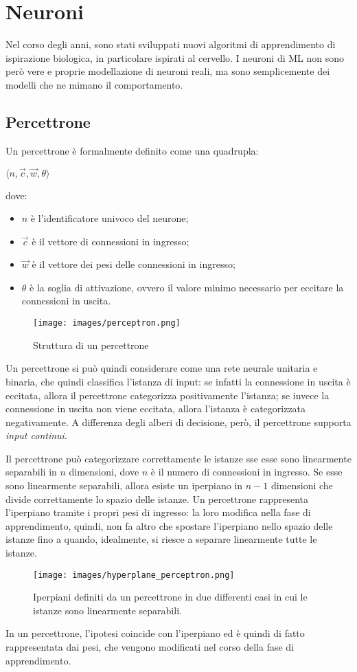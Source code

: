 \section{Neuroni}
Nel corso degli anni, sono stati sviluppati nuovi algoritmi di apprendimento di ispirazione biologica, in particolare ispirati al cervello.
I neuroni di ML non sono però vere e proprie modellazione di neuroni reali, ma sono semplicemente dei modelli che ne mimano il comportamento.

\subsection{Percettrone}
Un percettrone è formalmente definito come una quadrupla:
\begin{center}
    $\langle n, \Vec{c}, \Vec{w}, \theta \rangle$
\end{center}
dove:
\begin{itemize}
    \item $n$ è l'identificatore univoco del neurone;
    \item $\Vec{c}$ è il vettore di connessioni in ingresso;
    \item $\Vec{w}$ è il vettore dei pesi delle connessioni in ingresso;
    \item $\theta$ è la soglia di attivazione, ovvero il valore minimo necessario per eccitare la connessioni in uscita.
\end{itemize}

\begin{figure}[h]
    \centering
    \texttt{[image: images/perceptron.png]}
    \caption{Struttura di un percettrone}
    \label{fig:perceptron}
\end{figure}
Un percettrone si può quindi considerare come una rete neurale unitaria e binaria, che quindi classifica l'istanza di input: se infatti la connessione in uscita è eccitata, allora il percettrone categorizza positivamente l'istanza; se invece la connessione in uscita non viene eccitata, allora l'istanza è categorizzata negativamente.
A differenza degli alberi di decisione, però, il percettrone supporta \textit{input continui}.

Il percettrone può categorizzare correttamente le istanze sse esse sono linearmente separabili in $n$ dimensioni, dove $n$ è il numero di connessioni in ingresso. Se esse sono linearmente separabili, allora esiste un iperpiano in $n-1$ dimensioni che divide correttamente lo spazio delle istanze.
Un percettrone rappresenta l'iperpiano tramite i propri  pesi di ingresso: la loro modifica nella fase di apprendimento, quindi, non fa altro che spostare l'iperpiano nello spazio delle istanze fino a quando, idealmente, si riesce a separare linearmente tutte le istanze.
\begin{figure}[h]
    \centering
    \texttt{[image: images/hyperplane\_perceptron.png]}
    \caption{Iperpiani definiti da un percettrone in due differenti casi in cui le istanze sono linearmente separabili.}
    \label{fig:hyperplane_perceptron}
\end{figure}
In un percettrone, l'ipotesi coincide con l'iperpiano ed è quindi di fatto rappresentata dai pesi, che vengono modificati nel corso della fase di apprendimento.

